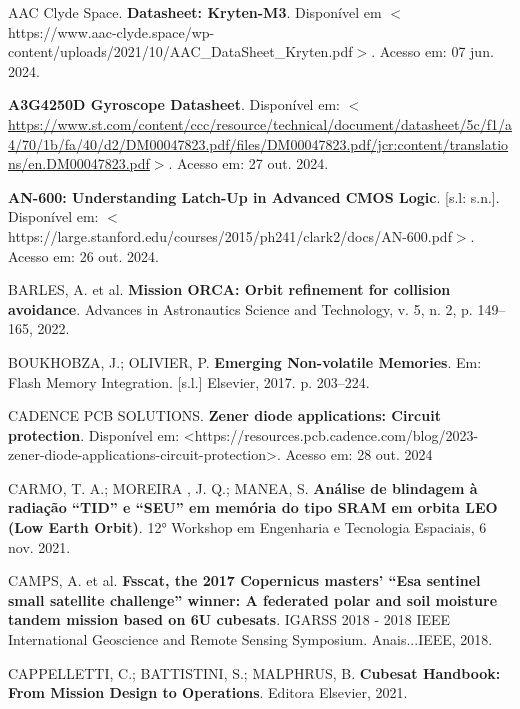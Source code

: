 \begin{flushleft}
\begin{thebibliography}{00} %
 AAC Clyde Space. \textbf{Datasheet: Kryten-M3}. Disponível em $<$https://www.aac-clyde.space/wp-content/uploads/2021/10/AAC\_DataSheet\_Kryten.pdf$>$.  Acesso em: 07 jun. 2024.

 \textbf{A3G4250D Gyroscope Datasheet}. Disponível em: $<$\url{https://www.st.com/content/ccc/resource/technical/document/datasheet/5c/f1/a4/70/1b/fa/40/d2/DM00047823.pdf/files/DM00047823.pdf/jcr:content/translations/en.DM00047823.pdf}$>$. Acesso em: 27 out. 2024. 

 \textbf{AN-600: Understanding Latch-Up in Advanced CMOS Logic}. [s.l: s.n.]. Disponível em: $<$https://large.stanford.edu/courses/2015/ph241/clark2/docs/AN-600.pdf$>$. Acesso em: 26 out. 2024.

 BARLES, A. et al. \textbf{Mission ORCA: Orbit refinement for collision avoidance}. Advances in Astronautics Science and Technology, v. 5, n. 2, p. 149–165, 2022.


 BOUKHOBZA, J.; OLIVIER, P. \textbf{Emerging Non-volatile Memories}. Em: Flash Memory Integration. [s.l.] Elsevier, 2017. p. 203–224.

 CADENCE PCB SOLUTIONS. \textbf{Zener diode applications: Circuit protection}. Disponível em: <https://resources.pcb.cadence.com/blog/2023-zener-diode-applications-circuit-protection>. Acesso em: 28 out. 2024

 CARMO, T. A.; MOREIRA , J. Q.; MANEA, S. \textbf{Análise de blindagem à radiação “TID” e “SEU” em memória do tipo SRAM em orbita LEO (Low Earth Orbit)}. 12° Workshop em Engenharia e Tecnologia Espaciais, 6 nov. 2021.

 CAMPS, A. et al. \textbf{Fsscat, the 2017 Copernicus masters’ “Esa sentinel small satellite challenge” winner: A federated polar and soil moisture tandem mission based on 6U cubesats}. IGARSS 2018 - 2018 IEEE International Geoscience and Remote Sensing Symposium. Anais...IEEE, 2018.

 CAPPELLETTI, C.; BATTISTINI, S.; MALPHRUS, B. \textbf{Cubesat Handbook: From Mission Design to Operations}. Editora Elsevier, 2021.


\end{thebibliography}
\end{flushleft}
